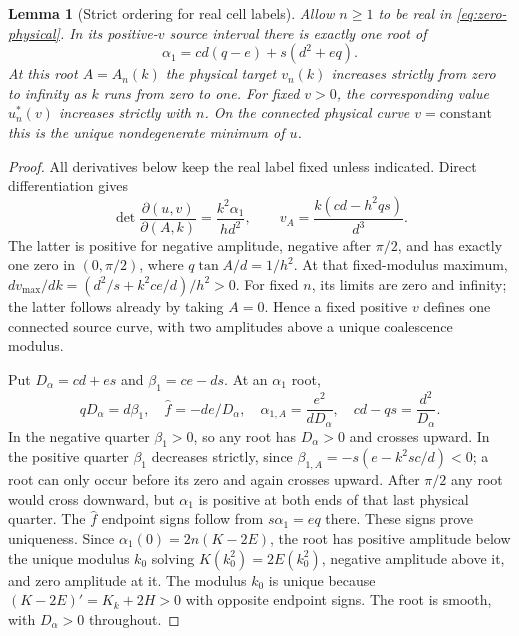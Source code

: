 \documentclass[11pt,a4paper]{article}
\newtheorem{lemma}[theorem]{Lemma}
\theoremstyle{remark}\newtheorem{remark}[theorem]{Remark}
\begin{document}
\begin{lemma}[Strict ordering for real cell labels]\label{lem:zero-order}
Allow $n\ge1$ to be real in \eqref{eq:zero-physical}. In its positive-$v$
source interval there is exactly one root of
\[
 \alpha_1=cd(q-e)+s(d^2+eq).
\]
At this root $A=A_n(k)$ the physical target $v_n(k)$ increases strictly
from zero to infinity as $k$ runs from zero to one. For fixed $v>0$,
the corresponding value $u_n^*(v)$ increases strictly with $n$.
On the connected physical curve $v=\text{constant}$ this is the unique
nondegenerate minimum of $u$.
\end{lemma}
\begin{proof}
All derivatives below keep the real label fixed unless indicated.
Direct differentiation gives
\begin{equation}\label{eq:zero-restricted}
 \det\frac{\partial(u,v)}{\partial(A,k)}
       =\frac{k^2\alpha_1}{h d^2},\qquad
 v_A=\frac{k(cd-h^2qs)}{d^3}.
\end{equation}
The latter is positive for negative amplitude, negative after $\pi/2$,
and has exactly one zero in $(0,\pi/2)$, where $q\tan A/d=1/h^2$.
At that fixed-modulus maximum,
$d v_{\max}/dk=(d^2/s+k^2ce/d)/h^2>0$.
For fixed $n$, its limits are zero and infinity; the latter follows
already by taking $A=0$. Hence a fixed positive $v$ defines one connected
source curve, with two amplitudes above a unique coalescence modulus.

Put $D_\alpha=cd+es$ and $\beta_1=ce-ds$. At an $\alpha_1$ root,
\begin{equation}\label{eq:zero-root}
 qD_\alpha=d\beta_1,\quad
 \widehat f=-de/D_\alpha,\quad
 \alpha_{1,A}=\frac{e^2}{dD_\alpha},\quad
 cd-qs=\frac{d^2}{D_\alpha}.
\end{equation}
In the negative quarter $\beta_1>0$, so any root has $D_\alpha>0$
and crosses upward. In the positive quarter $\beta_1$ decreases
strictly, since $\beta_{1,A}=-s(e-k^2sc/d)<0$; a root can only
occur before its zero and again crosses upward. After $\pi/2$ any
root would cross downward, but $\alpha_1$ is positive at both ends
of that last physical quarter. The $\widehat f$ endpoint signs follow from
$s\alpha_1=eq$ there. These signs prove uniqueness.
Since $\alpha_1(0)=2n(K-2E)$, the root has positive amplitude below
the unique modulus $k_0$ solving $K(k_0^2)=2E(k_0^2)$, negative
amplitude above it, and zero amplitude at it. The modulus $k_0$ is
unique because $(K-2E)'=K_k+2H>0$ with opposite endpoint signs.
The root is smooth, with $D_\alpha>0$ throughout.


\end{proof}
\end{document}
